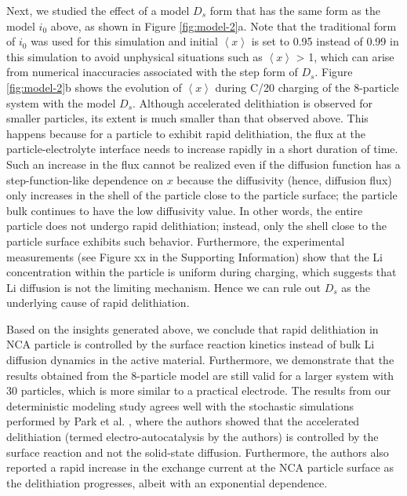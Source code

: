 \documentclass{article}
\begin{document}
Next, we studied the effect of a model $D_s$ form that has the same form as the model $i_0$ above, as shown in Figure \ref{fig:model-2}a. Note that the traditional form of $i_0$ was used for this simulation and initial $\left\langle x\right\rangle$ is set to 0.95 instead of 0.99 in this simulation to avoid unphysical situations such as $\left\langle x\right\rangle$ > 1, which can arise from numerical inaccuracies associated with the step form of $D_s$. Figure \ref{fig:model-2}b shows the evolution of $\left\langle x \right\rangle$ during C/20 charging of the 8-particle system with the model $D_s$. Although accelerated delithiation is observed for smaller particles, its extent is much smaller than that observed above. This happens because for a particle to exhibit rapid delithiation, the flux at the particle-electrolyte interface needs to increase rapidly in a short duration of time. Such an increase in the flux cannot be realized even if the diffusion function has a step-function-like dependence on $x$ because the diffusivity (hence, diffusion flux) only increases in the shell of the particle close to the particle surface; the particle bulk continues to have the low diffusivity value. In other words, the entire particle does not undergo rapid delithiation; instead, only the shell close to the particle surface exhibits such behavior. Furthermore, the experimental measurements (see Figure xx in the Supporting Information) show that the Li concentration within the particle is uniform during charging, which suggests that Li diffusion is not the limiting mechanism. Hence we can rule out $D_s$ as the underlying cause of rapid delithiation. 

Based on the insights generated above, we conclude that rapid delithiation in NCA particle is controlled by the surface reaction kinetics instead of bulk Li diffusion dynamics in the active material. Furthermore, we demonstrate that the results obtained from the 8-particle model are still valid for a larger system with 30 particles, which is more similar to a practical electrode. The results from our deterministic modeling study agrees well with the stochastic simulations performed by Park et al. \cite{chueh2021}, where the authors showed that the accelerated delithiation (termed electro-autocatalysis by the authors) is controlled by the surface reaction and not the solid-state diffusion. Furthermore, the authors also reported a rapid increase in the exchange current at the NCA particle surface as the delithiation progresses, albeit with an exponential dependence.  
\end{document}
